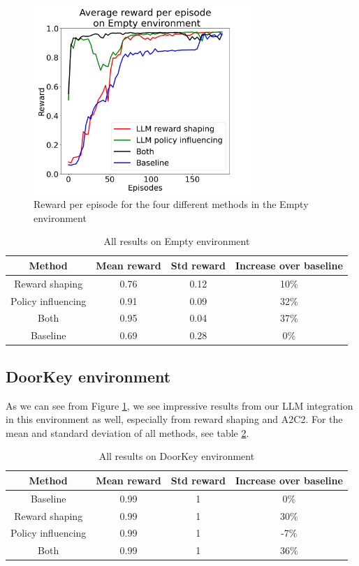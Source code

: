 \documentclass[conference]{IEEEtran}
\begin{document}
\begin{figure}[h]
\centerline{\includegraphics[width=3.25in]{figure/emptyresults.png}}
\caption{Reward per episode for the four different methods in the Empty environment}
\label{doorkeyresults}
\end{figure}

\begin{table}[h]
\caption{All results on Empty environment}
\begin{center}
\label{emptytable}
\begin{tabular}{c | c c c}
Method & Mean reward & Std reward & Increase over baseline \\
\hline
Reward shaping & 0.76 & 0.12 & 10\% \\
Policy influencing & 0.91 & 0.09 & 32\% \\
Both & 0.95 & 0.04 & 37\% \\
Baseline & 0.69 & 0.28 & 0\% \\
\end{tabular}
\end{center}
\end{table}


\subsection{DoorKey environment}

As we can see from Figure \ref{doorkeyresults}, we see impressive results from our LLM integration in this environment as well, especially from reward shaping and A2C2. For the mean and standard deviation of all methods, see table \ref{doorkeytable}.

\begin{table}[h]
\caption{All results on DoorKey environment}
\begin{center}
\label{doorkeytable}
\begin{tabular}{c | c c c}
Method & Mean reward & Std reward & Increase over baseline \\
\hline
Baseline & 0.99 & 1 & 0\% \\
Reward shaping & 0.99 & 1 & 30\% \\
Policy influencing & 0.99 & 1 & -7\% \\
Both & 0.99 & 1 & 36\% \\
\end{tabular}
\end{center}
\end{table}
\end{document}
